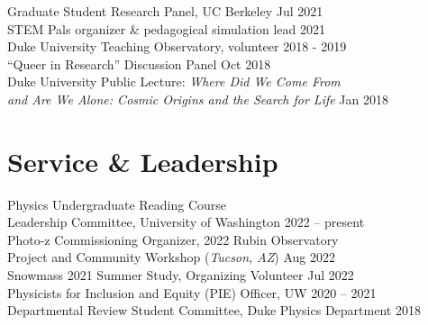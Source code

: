 \documentclass[margin, 11pt]{res}
\begin{document}
\begin{resume}
Graduate Student Research Panel, UC Berkeley \hfill Jul 2021 \\
STEM Pals organizer \& pedagogical simulation lead  \hfill 2021 \\
Duke University Teaching Observatory, volunteer \hfill 2018 - 2019 \\
``Queer in Research'' Discussion Panel \hfill Oct 2018 \\
Duke University Public Lecture: \textit{Where Did We Come From} \\
\hspace*{4mm} \textit{and Are We Alone: Cosmic Origins and the Search for Life} \hfill Jan 2018



\section{Service \& Leadership}

Physics Undergraduate Reading Course \\
\hspace*{4mm} Leadership Committee, University of Washington \hfill 2022 -- present \\
Photo-z Commissioning Organizer, 2022 Rubin Observatory \\ 
\hspace*{4mm} Project and Community Workshop (\textit{Tucson, AZ}) \hfill Aug 2022 \\
Snowmass 2021 Summer Study, Organizing Volunteer \hfill Jul 2022 \\
Physicists for Inclusion and Equity (PIE) Officer, UW \hfill 2020 -- 2021 \\
Departmental Review Student Committee, Duke Physics Department \hfill 2018 \\




\end{resume}
\end{document}

